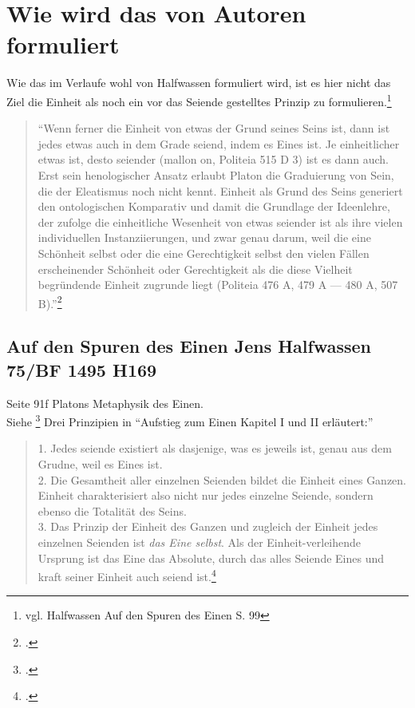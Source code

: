 \documentclass[12pt]{article}
\newcommand*{\zitatblock}[1]{%
    \begin{quote}
    \fontsize{10}{12}\selectfont
    \setlength{\parskip}{1.0em}
    #1
    \end{quote}
}
\begin{document}
\section{Wie wird das von Autoren formuliert}
Wie das im Verlaufe wohl von Halfwassen formuliert wird, ist es hier nicht das Ziel die Einheit als noch ein vor das Seiende gestelltes Prinzip zu formulieren.\footnote{vgl. Halfwassen Auf den Spuren des Einen S. 99}
\zitatblock{\enquote{Wenn ferner die Einheit von etwas der Grund seines Seins ist, dann ist jedes etwas auch in dem Grade seiend, indem es Eines ist. Je einheitlicher etwas ist, desto seiender (mallon on, Politeia 515 D 3) ist es dann auch. Erst sein henologischer Ansatz erlaubt Platon die Graduierung von Sein, die der Eleatismus noch nicht kennt. Einheit als Grund des Seins generiert den ontologischen Komparativ und damit die Grundlage der Ideenlehre, der zufolge die einheitliche Wesenheit von etwas seiender ist als ihre vielen individuellen Instanziierungen, und zwar genau darum, weil die eine Schönheit selbst oder die eine Gerechtigkeit selbst den vielen Fällen erscheinender Schönheit oder Gerechtigkeit als die diese Vielheit begründende Einheit zugrunde liegt (Politeia 476 A, 479 A — 480 A, 507 B).}\footcite[][S. 99f.]{halfwassen2015spuren}}
\subsection*{Auf den Spuren des Einen Jens Halfwassen  75/BF 1495 H169}
Seite 91f Platons Metaphysik des Einen.\\
Siehe \footcite[][]{halfwassen2015spuren}
Drei Prinzipien in \enquote{Aufstieg zum Einen Kapitel I und II erläutert:} \zitatblock{1. Jedes seiende existiert als dasjenige, was es jeweils ist, genau aus dem Grudne, weil es Eines ist.\\2. Die Gesamtheit aller einzelnen Seienden bildet die Einheit eines Ganzen. Einheit charakterisiert also nicht nur jedes einzelne Seiende, sondern ebenso die Totalität des Seins.\\3. Das Prinzip der Einheit des Ganzen und zugleich der Einheit jedes einzelnen Seienden ist \emph{das Eine selbst}. Als der Einheit-verleihende Ursprung ist das Eine das Absolute, durch das alles Seiende Eines und kraft seiner Einheit auch seiend ist.\footcite[][S. 91]{halfwassen2015spuren}}
\end{document}
